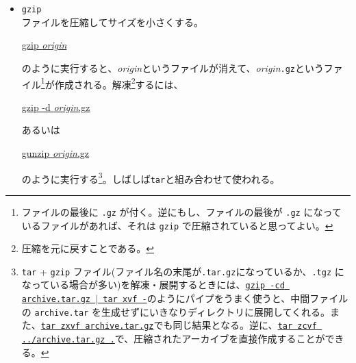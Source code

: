 \begin{itemize}
          ファイルをまとめて一つにまとめる。\textbf{t}ape \textbf{ar}chiverの略である。ファイルを転送したり、バックアップを取るときに利用する。
          \begin{commandline2}
              \prompt \underline{tar cvf ../archive.tar .}
          \end{commandline2} \noindent
          のように使うと、\texttt{../archive.tar} というファイル\footnote{ファイル名の最後に \texttt{.tar} を付ける習慣にしておくと、あとで混乱が少なくなる。}にカレントディレクトリ以下のすべてのファイルのバックアップが取られる。\texttt{.} の代わりに \texttt{\(\ast\).c} を使えば カレントディレクトリの \texttt{.c} で終るファイルがまとめられる。また、\texttt{.} の部分にディレクトリを指定すれば、そのディレクトリ以下のファイルすべてのバックアップを取ることができる。反対に展開するときは、
          \begin{commandline2}
              \prompt \underline{tar xvf archive.tar}
          \end{commandline2} \noindent
          のようにする。
    \item \texttt{gzip}\\
          ファイルを圧縮してサイズを小さくする。
          \begin{commandline2}
              \prompt \underline{gzip \textit{origin}}
          \end{commandline2} \noindent
          のように実行すると、\textit{origin}というファイルが消えて、\textit{origin}\texttt{.gz}というファイル\footnote{ファイルの最後に \texttt{.gz} が付く。逆にもし、ファイルの最後が \texttt{.gz} になっているファイルがあれば、それは \texttt{gzip} で圧縮されていると思ってよい。}が作成される。解凍\footnote{圧縮を元に戻すことである。}するには、
          \begin{commandline2}
              \prompt \underline{gzip -d \textit{origin}.gz}
          \end{commandline2} \noindent
          あるいは
          \begin{commandline2}
              \prompt \underline{gunzip \textit{origin}.gz}
          \end{commandline2} \noindent
          のように実行する\footnote{\texttt{tar} + \texttt{gzip} ファイル(ファイル名の末尾が\texttt{.tar.gz}になっているか、\texttt{.tgz} になっている場合が多い)を解凍・展開するときには、\texttt{\underline{gzip -cd archive.tar.gz \(|\) tar xvf -}}のようにパイプをうまく使うと、中間ファイルの \texttt{archive.tar} を生成せずにいきなりディレクトリに展開してくれる。また、\underline{\texttt{tar zxvf archive.tar.gz}}でも同じ結果となる。逆に、\underline{\texttt{tar zcvf ../archive.tar.gz .}}で、圧縮されたアーカイブを直接作成することができる。}。しばしば\texttt{tar}と組み合わせて使われる。


\end{itemize}
